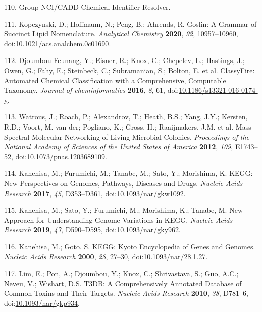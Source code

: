 \documentclass[]{article}
\begin{document}
\leavevmode\hypertarget{ref-ncicaddgroup_website_nd}{}%
110. Group NCI/CADD Chemical Identifier Resolver.

\leavevmode\hypertarget{ref-kopczynski_2020}{}%
111. Kopczynski, D.; Hoffmann, N.; Peng, B.; Ahrends, R. Goslin: A Grammar of Succinct Lipid Nomenclature. \emph{Analytical Chemistry} \textbf{2020}, \emph{92}, 10957--10960, doi:\href{https://doi.org/10.1021/acs.analchem.0c01690}{10.1021/acs.analchem.0c01690}.

\leavevmode\hypertarget{ref-djoumboufeunang_2016}{}%
112. Djoumbou Feunang, Y.; Eisner, R.; Knox, C.; Chepelev, L.; Hastings, J.; Owen, G.; Fahy, E.; Steinbeck, C.; Subramanian, S.; Bolton, E. et al. ClassyFire: Automated Chemical Classification with a Comprehensive, Computable Taxonomy. \emph{Journal of cheminformatics} \textbf{2016}, \emph{8}, 61, doi:\href{https://doi.org/10.1186/s13321-016-0174-y}{10.1186/s13321-016-0174-y}.

\leavevmode\hypertarget{ref-watrous_2012}{}%
113. Watrous, J.; Roach, P.; Alexandrov, T.; Heath, B.S.; Yang, J.Y.; Kersten, R.D.; Voort, M. van der; Pogliano, K.; Gross, H.; Raaijmakers, J.M. et al. Mass Spectral Molecular Networking of Living Microbial Colonies. \emph{Proceedings of the National Academy of Sciences of the United States of America} \textbf{2012}, \emph{109}, E1743--52, doi:\href{https://doi.org/10.1073/pnas.1203689109}{10.1073/pnas.1203689109}.

\leavevmode\hypertarget{ref-kanehisa_2017}{}%
114. Kanehisa, M.; Furumichi, M.; Tanabe, M.; Sato, Y.; Morishima, K. KEGG: New Perspectives on Genomes, Pathways, Diseases and Drugs. \emph{Nucleic Acids Research} \textbf{2017}, \emph{45}, D353--D361, doi:\href{https://doi.org/10.1093/nar/gkw1092}{10.1093/nar/gkw1092}.

\leavevmode\hypertarget{ref-kanehisa_2019}{}%
115. Kanehisa, M.; Sato, Y.; Furumichi, M.; Morishima, K.; Tanabe, M. New Approach for Understanding Genome Variations in KEGG. \emph{Nucleic Acids Research} \textbf{2019}, \emph{47}, D590--D595, doi:\href{https://doi.org/10.1093/nar/gky962}{10.1093/nar/gky962}.

\leavevmode\hypertarget{ref-kanehisa_2000}{}%
116. Kanehisa, M.; Goto, S. KEGG: Kyoto Encyclopedia of Genes and Genomes. \emph{Nucleic Acids Research} \textbf{2000}, \emph{28}, 27--30, doi:\href{https://doi.org/10.1093/nar/28.1.27}{10.1093/nar/28.1.27}.

\leavevmode\hypertarget{ref-lim_2010}{}%
117. Lim, E.; Pon, A.; Djoumbou, Y.; Knox, C.; Shrivastava, S.; Guo, A.C.; Neveu, V.; Wishart, D.S. T3DB: A Comprehensively Annotated Database of Common Toxins and Their Targets. \emph{Nucleic Acids Research} \textbf{2010}, \emph{38}, D781--6, doi:\href{https://doi.org/10.1093/nar/gkp934}{10.1093/nar/gkp934}.
\end{document}
